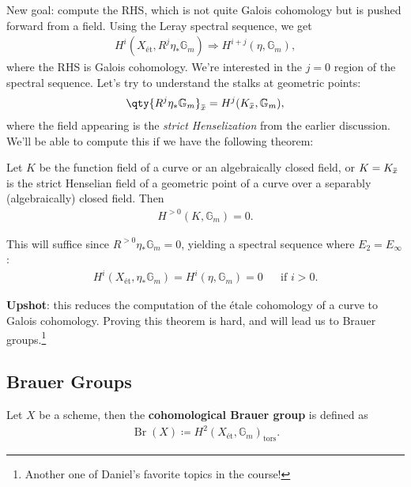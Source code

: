 New goal: compute the RHS, which is not quite Galois cohomology but is
pushed forward from a field. Using the Leray spectral sequence, we get
\begin{align*}  
H^i(X_\text{ét}, R^j \eta_* {\mathbb{G}}_m)
\Rightarrow
H^{i+j}(\eta, {\mathbb{G}}_m)
,\end{align*}
where the RHS is Galois cohomology. We're interested in the \(j=0\)
region of the spectral sequence. Let's try to understand the stalks at
geometric points:
\begin{align*}  
\qty{R^j \eta_* {\mathbb{G}}_m}_{\mkern 1.5mu\overline{\mkern-1.5mux\mkern-1.5mu}\mkern 1.5mu}
=
H^j(K_{\mkern 1.5mu\overline{\mkern-1.5mux\mkern-1.5mu}\mkern 1.5mu}, {\mathbb{G}}_m)
,\end{align*}
where the field appearing is the \emph{strict Henselization} from the
earlier discussion. We'll be able to compute this if we have the
following theorem:

\begin{theorem}[?]

Let \(K\) be the function field of a curve or an algebraically closed
field, or
\(K = K_{\mkern 1.5mu\overline{\mkern-1.5mux\mkern-1.5mu}\mkern 1.5mu}\)
is the strict Henselian field of a geometric point of a curve over a
separably (algebraically) closed field. Then
\begin{align*}  
H^{>0}(K, {\mathbb{G}}_m) = 0
.\end{align*}

\end{theorem}

This will suffice since \(R^{>0} \eta_*{\mathbb{G}}_m = 0\), yielding a
spectral sequence where \(E_2 = E_ \infty\):
\begin{align*}  
H^i(X_\text{ét}, \eta_* {\mathbb{G}}_m)
=
H^i(\eta,{\mathbb{G}}_m)
=
0 && \text{if }i>0
.\end{align*}

\textbf{Upshot}: this reduces the computation of the étale cohomology of
a curve to Galois cohomology. Proving this theorem is hard, and will
lead us to Brauer groups.\footnote{Another one of Daniel's favorite
  topics in the course!}

\hypertarget{brauer-groups}{%
\subsection{Brauer Groups}\label{brauer-groups}}

\begin{definition}\label{def:cohom_brauer_group}

Let \(X\) be a scheme, then the \textbf{cohomological Brauer group} is
defined as
\begin{align*}  
\operatorname{Br}(X) \coloneqq H^2(X_\text{ét}, {\mathbb{G}}_m)_{{\operatorname{tors}}}
.\end{align*}

\end{definition}

